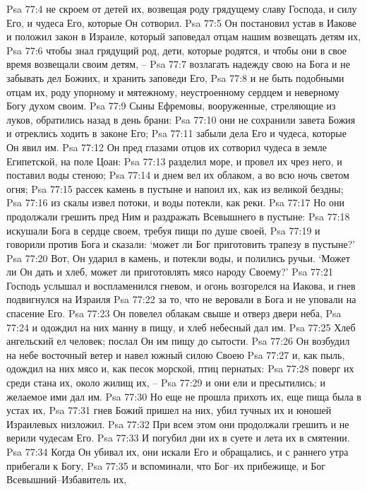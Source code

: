 Psa 77:4  не скроем от детей их, возвещая роду грядущему славу Господа, и силу Его, и чудеса Его, которые Он сотворил.
Psa 77:5  Он постановил устав в Иакове и положил закон в Израиле, который заповедал отцам нашим возвещать детям их,
Psa 77:6  чтобы знал грядущий род, дети, которые родятся, и чтобы они в свое время возвещали своим детям, --
Psa 77:7  возлагать надежду свою на Бога и не забывать дел Божиих, и хранить заповеди Его,
Psa 77:8  и не быть подобными отцам их, роду упорному и мятежному, неустроенному сердцем и неверному Богу духом своим.
Psa 77:9  Сыны Ефремовы, вооруженные, стреляющие из луков, обратились назад в день брани:
Psa 77:10  они не сохранили завета Божия и отреклись ходить в законе Его;
Psa 77:11  забыли дела Его и чудеса, которые Он явил им.
Psa 77:12  Он пред глазами отцов их сотворил чудеса в земле Египетской, на поле Цоан:
Psa 77:13  разделил море, и провел их чрез него, и поставил воды стеною;
Psa 77:14  и днем вел их облаком, а во всю ночь светом огня;
Psa 77:15  рассек камень в пустыне и напоил их, как из великой бездны;
Psa 77:16  из скалы извел потоки, и воды потекли, как реки.
Psa 77:17  Но они продолжали грешить пред Ним и раздражать Всевышнего в пустыне:
Psa 77:18  искушали Бога в сердце своем, требуя пищи по душе своей,
Psa 77:19  и говорили против Бога и сказали: `может ли Бог приготовить трапезу в пустыне?'
Psa 77:20  Вот, Он ударил в камень, и потекли воды, и полились ручьи. `Может ли Он дать и хлеб, может ли приготовлять мясо народу Своему?'
Psa 77:21  Господь услышал и воспламенился гневом, и огонь возгорелся на Иакова, и гнев подвигнулся на Израиля
Psa 77:22  за то, что не веровали в Бога и не уповали на спасение Его.
Psa 77:23  Он повелел облакам свыше и отверз двери неба,
Psa 77:24  и одождил на них манну в пищу, и хлеб небесный дал им.
Psa 77:25  Хлеб ангельский ел человек; послал Он им пищу до сытости.
Psa 77:26  Он возбудил на небе восточный ветер и навел южный силою Своею
Psa 77:27  и, как пыль, одождил на них мясо и, как песок морской, птиц пернатых:
Psa 77:28  поверг их среди стана их, около жилищ их, --
Psa 77:29  и они ели и пресытились; и желаемое ими дал им.
Psa 77:30  Но еще не прошла прихоть их, еще пища была в устах их,
Psa 77:31  гнев Божий пришел на них, убил тучных их и юношей Израилевых низложил.
Psa 77:32  При всем этом они продолжали грешить и не верили чудесам Его.
Psa 77:33  И погубил дни их в суете и лета их в смятении.
Psa 77:34  Когда Он убивал их, они искали Его и обращались, и с раннего утра прибегали к Богу,
Psa 77:35  и вспоминали, что Бог--их прибежище, и Бог Всевышний--Избавитель их,
